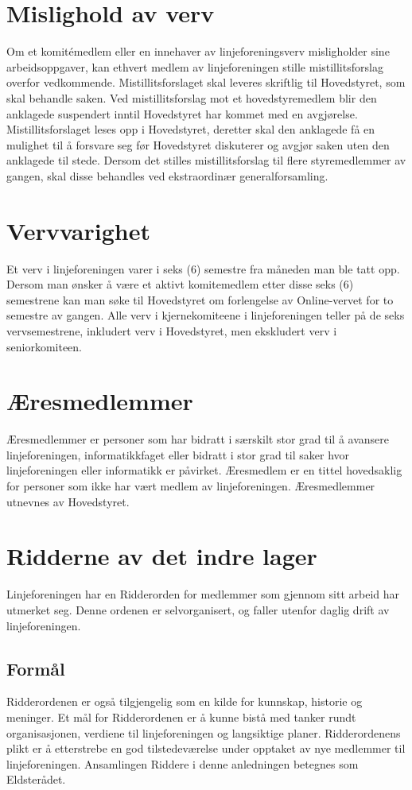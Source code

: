 \section{Mislighold av verv}{
Om et komitémedlem eller en innehaver av linjeforeningsverv misligholder sine arbeidsoppgaver, kan ethvert medlem av linjeforeningen stille mistillitsforslag overfor vedkommende. Mistillitsforslaget skal leveres skriftlig til Hovedstyret, som skal behandle saken. Ved mistillitsforslag mot et hovedstyremedlem blir den anklagede suspendert inntil Hovedstyret har kommet med en avgjørelse. Mistillitsforslaget leses opp i Hovedstyret, deretter skal den anklagede få en mulighet til å forsvare seg før Hovedstyret diskuterer og avgjør saken uten den anklagede til stede. Dersom det stilles mistillitsforslag til flere styremedlemmer av gangen, skal disse behandles ved ekstraordinær generalforsamling. 
}

\section{Vervvarighet}{
Et verv i linjeforeningen varer i seks (6) semestre fra måneden man ble tatt opp. Dersom man ønsker å være et aktivt komitemedlem etter disse seks (6) semestrene kan man søke til Hovedstyret om forlengelse av Online-vervet for to semestre av gangen. Alle verv i kjernekomiteene i linjeforeningen teller på de seks vervsemestrene, inkludert verv i Hovedstyret, men ekskludert verv i seniorkomiteen. 
}

\section{Æresmedlemmer}{
Æresmedlemmer er personer som har bidratt i særskilt stor grad til å avansere linjeforeningen, informatikkfaget eller bidratt i stor grad til saker hvor linjeforeningen eller informatikk er påvirket.
Æresmedlem er en tittel hovedsaklig for personer som ikke har vært medlem av linjeforeningen.
Æresmedlemmer utnevnes av Hovedstyret.

}
\section{Ridderne av det indre lager}

Linjeforeningen har en Ridderorden for medlemmer som gjennom sitt arbeid har utmerket seg. Denne ordenen er selvorganisert, og faller utenfor daglig drift av linjeforeningen.

\subsection{Formål}
Ridderordenen er også tilgjengelig som en kilde for kunnskap, historie og meninger. Et mål for Ridderordenen er å kunne bistå med tanker rundt organisasjonen, verdiene til linjeforeningen og langsiktige planer.
Ridderordenens plikt er å etterstrebe en god tilstedeværelse under opptaket av nye medlemmer til linjeforeningen. Ansamlingen Riddere i denne anledningen betegnes som Eldsterådet.


